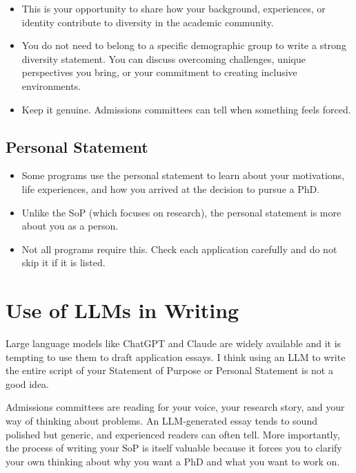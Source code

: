\documentclass[11pt, letterpaper]{article}
\begin{document}
\begin{itemize}[leftmargin=*, itemsep=2pt]
    \item This is your opportunity to share how your background, experiences, or identity contribute to diversity in the academic community.
    \item You do not need to belong to a specific demographic group to write a strong diversity statement. You can discuss overcoming challenges, unique perspectives you bring, or your commitment to creating inclusive environments.
    \item Keep it genuine. Admissions committees can tell when something feels forced.
\end{itemize}

\subsection{Personal Statement}

\begin{itemize}[leftmargin=*, itemsep=2pt]
    \item Some programs use the personal statement to learn about your motivations, life experiences, and how you arrived at the decision to pursue a PhD.
    \item Unlike the SoP (which focuses on research), the personal statement is more about you as a person.
    \item Not all programs require this. Check each application carefully and do not skip it if it is listed.
\end{itemize}


\section{Use of LLMs in Writing}\label{sec:llm}

Large language models like ChatGPT and Claude are widely available and it is tempting to use them to draft application essays. I think using an LLM to write the entire script of your Statement of Purpose or Personal Statement is not a good idea.

Admissions committees are reading for your voice, your research story, and your way of thinking about problems. An LLM-generated essay tends to sound polished but generic, and experienced readers can often tell. More importantly, the process of writing your SoP is itself valuable because it forces you to clarify your own thinking about why you want a PhD and what you want to work on.
\end{document}
